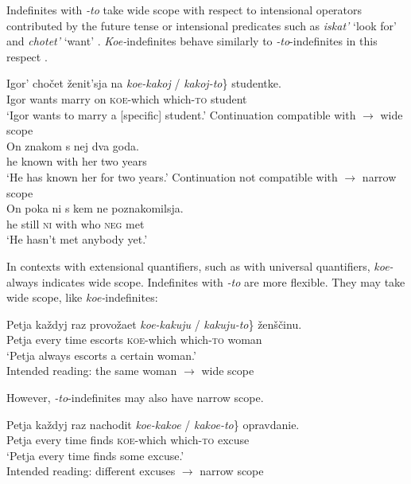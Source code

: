 \documentclass[output=paper,colorlinks,citecolor=brown]{langscibook}
\begin{document}

Indefinites with \textit{-to} take wide scope with respect to intensional operators contributed by the future tense or intensional predicates such as \textit{iskat’} ‘look for’ and \textit{chotet’} ‘want’ \citep{Ioup1977,Pereltsvaig2000}. \textit{Koe-}indefinites behave similarly to \textit{-to}-indefinites in this respect \citep{Geist2008,Kagan2011}.

\ea\label{geist:ex:koe-to-scope-geist}
\gll Igor’ chočet ženit’sja na \minsp{\{} \textit{koe-kakoj} / \textit{kakoj-to}\} studentke.\\
Igor wants marry on {} \textsc{koe}-which {} which-\textsc{to} student\\
\glt ‘Igor wants to marry a [specific] student.’\hfill \citep[155]{Geist2008}
\ea Continuation compatible with  $\rightarrow$ wide scope\\
\gll On znakom s nej dva goda.\\
he known with her two years\\
\glt ‘He has known her for two years.’
\ex Continuation not compatible with  $\rightarrow$ narrow scope\\
\gll On poka ni s kem ne poznakomilsja.\\
he still \textsc{ni} with who \textsc{neg} met\\
\glt ‘He hasn't met anybody yet.’
\z\z


In contexts with extensional quantifiers, such as with universal quantifiers, \textit{koe-} always indicates wide scope. Indefinites with \textit{-to} are more flexible. They may take wide scope, like \textit{koe-}indefinites:

\ea
\gll Petja každyj raz provožaet \minsp{\{} \textit{koe-kakuju} / \textit{kakuju-to}\} ženščinu.\\
Petja every time escorts {} \textsc{koe}-which  {} which-\textsc{to} woman\\
\glt ‘Petja always escorts a certain woman.’\\
Intended reading: the same woman $\rightarrow$ wide scope\hfill \citep[56]{Kagan2011}
\z

\noindent However, \textit{-to}-indefinites may also have narrow scope.

\ea\label{geist:ex:koe-to-scope-kagan2}
\gll Petja každyj raz nachodit \minsp{\{\#} \textit{koe-kakoe} / \textit{kakoe-to}\} opravdanie.\\
Petja every time finds {} \textsc{koe}-which {} which-\textsc{to} excuse\\
\glt ‘Petja every time finds some excuse.’\\
Intended reading: different excuses $\rightarrow$ narrow scope\hfill \citep[56]{Kagan2011}
\z
\end{document}
